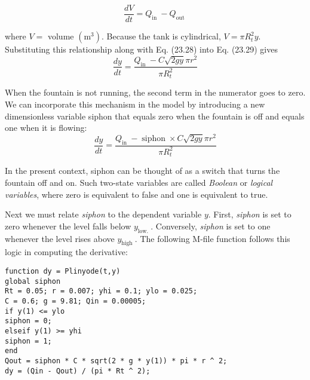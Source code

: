 \documentclass[../main.tex]{subfiles}
\begin{document}
\begin{equation}
    \tag{23.29}
    \frac{d V}{d t}=Q_{\text {in }}-Q_{\text {out }}
\end{equation}

\noindent where $V=$ volume $\left(\mathrm{m}^{3}\right)$. Because the tank is cylindrical, $V=\pi R_{t}^{2} y$. Substituting this relationship along with Eq. (23.28) into Eq. (23.29) gives
\begin{equation}
    \tag{23.30}
    \frac{d y}{d t}=\frac{Q_{\text {in }}-C \sqrt{2 g y} \pi r^{2}}{\pi R_{t}^{2}}
\end{equation}

When the fountain is not running, the second term in the numerator goes to zero. We can incorporate this mechanism in the model by introducing a new dimensionless variable siphon that equals zero when the fountain is off and equals one when it is flowing:
\begin{equation}
    \tag{23.31}
    \frac{d y}{d t}=\frac{Q_{\text {in }}-\operatorname{siphon} \times C \sqrt{2 g y} \pi r^{2}}{\pi R_{t}^{2}}
\end{equation}

\noindent In the present context, siphon can be thought of as a switch that turns the fountain off and on. Such two-state variables are called \textit{Boolean} or \textit{logical variables}, where zero is equivalent to false and one is equivalent to true.

Next we must relate \textit{siphon} to the dependent variable $y$. First, \textit{siphon} is set to zero whenever the level falls below $y_{\text {low. }}$. Conversely, \textit{siphon} is set to one whenever the level rises above $y_{\text {high }}$. The following M-file function follows this logic in computing the derivative:

\texttt{function dy = Plinyode(t,y)\\
\indent global siphon\\
\indent Rt = 0.05; r = 0.007; yhi = 0.1; ylo = 0.025;\\
\indent C = 0.6; g = 9.81; Qin = 0.00005;\\
\indent if y(1) <= ylo\\
\indent \vspace{\smallskipamount} siphon = 0;\\
\indent elseif y(1) >= yhi\\
\indent \vspace{\smallskipamount} siphon = 1;\\
\indent end\\
\indent Qout = siphon * C * sqrt(2 * g * y(1)) * pi * r \^{} 2;\\
\indent dy = (Qin - Qout) / (pi * Rt \^{} 2);}
\end{document}
